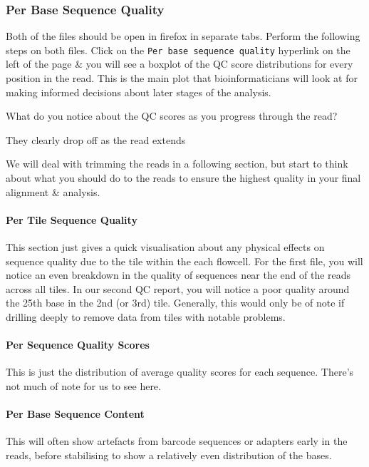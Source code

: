\subsubsection*{Per Base Sequence Quality}
\begin{steps}
Both of the files should be open in firefox in separate tabs.
Perform the following steps on both files.
Click on the \texttt{Per base sequence quality} hyperlink on the left of the page \& you will see a boxplot of the QC score distributions for every position in the read.
This is the main plot that bioinformaticians will look at for making informed decisions about later stages of the analysis.
\end{steps}

\begin{questions}
What do you notice about the QC scores as you progress through the read? \\
\begin{answer}
They clearly drop off as the read extends\\
\end{answer} 
\end{questions}

We will deal with trimming the reads in a following section, but start to think about what you should do to the reads to ensure the highest quality in your final alignment \& analysis.

\paragraph{Per Tile Sequence Quality}
This section just gives a quick visualisation about any physical effects on sequence quality due to the tile within the each flowcell.
For the first file, you will notice an even breakdown in the quality of sequences near the end of the reads across all tiles.
In our second QC report, you will notice a poor quality around the 25th base in the 2nd (or 3rd) tile.
Generally, this would only be of note if drilling deeply to remove data from tiles with notable problems.

\paragraph*{Per Sequence Quality Scores}
This is just the distribution of average quality scores for each sequence.
There's not much of note for us to see here.

\paragraph{Per Base Sequence Content}
This will often show artefacts from barcode sequences or adapters early in the reads, before stabilising to show a relatively even distribution of the bases.

